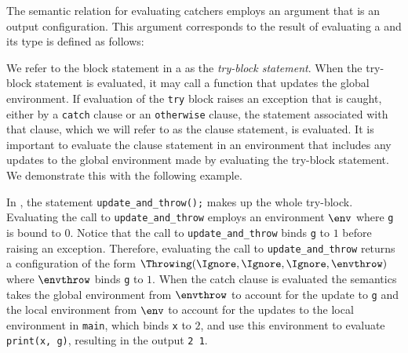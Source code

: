   

The semantic relation for evaluating catchers employs an argument
that is an output configuration. This argument corresponds to the result
of evaluating a \trystatementterm{} and its type is defined as follows:


We refer to the block statement in a
\trystatementterm{} as the \emph{try-block statement}.
When the try-block statement is evaluated, it may call a function that updates
the global environment. If evaluation of the \texttt{try} block raises an exception that is caught,
either by a \texttt{catch} clause or an \texttt{otherwise} clause,
the statement associated with that clause, which we will refer to as the clause statement, is evaluated.
It is important to evaluate the clause statement in an environment that includes any updates
to the global environment made by evaluating the try-block statement.
%
We demonstrate this with the following example.

In , the statement \verb|update_and_throw();|
makes up the whole try-block.
Evaluating the call to \verb|update_and_throw| employs an environment $\env$ where
\texttt{g} is bound to $0$.
Notice that the call to \verb|update_and_throw| binds \texttt{g} to $1$ before raising an exception.
Therefore, evaluating the call to \verb|update_and_throw| returns a configuration
of the form
$\Throwing(\Ignore, \Ignore, \Ignore, \envthrow)$ where $\envthrow$ binds \texttt{g} to $1$.
When the catch clause is evaluated the semantics takes the global environment from $\envthrow$
to account for the update to \texttt{g} and the local environment from $\env$ to account for the
updates to the local environment in \texttt{main}, which binds \texttt{x} to $2$, and use this
environment to evaluate \texttt{print(x, g)}, resulting in the output \texttt{2 1}.

